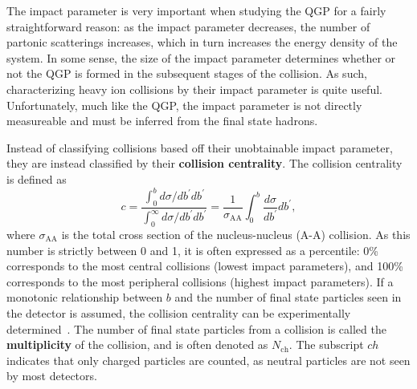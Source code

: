 The impact parameter is very important when studying the QGP for a fairly straightforward reason: as the impact parameter decreases, the number of partonic scatterings increases, which in turn increases the energy density of the system. In some sense, the size of the impact parameter determines whether or not the QGP is formed in the subsequent stages of the collision. As such, characterizing heavy ion collisions by their impact parameter is quite useful.  Unfortunately, much like the QGP, the impact parameter is not directly measureable and must be inferred from the final state hadrons.

Instead of classifying collisions based off their unobtainable impact parameter, they are instead classified by their \textbf{collision centrality}. The collision centrality is defined as
%
\begin{equation}
    \label{eq:centrality}
    c=\frac{\int_0^b d \sigma / d b^{\prime} d b^{\prime}}{\int_0^{\infty} d \sigma / d b^{\prime} d b^{\prime}}=\frac{1}{\sigma_{\mathrm{AA}}} \int_0^b \frac{d \sigma}{d b^{\prime}} d b^{\prime},
\end{equation}
%
where $\sigma_{\mathrm{AA}}$ is the total cross section of the nucleus-nucleus (A-A) collision. As this number is strictly between 0 and 1, it is often expressed as a percentile: 0\% corresponds to the most central collisions (lowest impact parameters), and 100\% corresponds to the most peripheral collisions (highest impact parameters). If a monotonic relationship between $b$ and the number of final state particles seen in the detector is assumed, the collision centrality can be experimentally determined~\cite{MonotonicMultiplicity}. The number of final state particles from a collision is called the \textbf{multiplicity} of the collision, and is often denoted as $N_\text{ch}$. The subscript $ch$ indicates that only charged particles are counted, as neutral particles are not seen by most detectors. 

